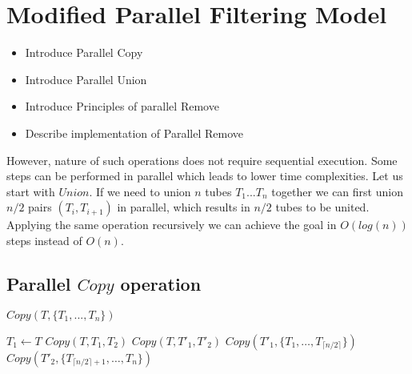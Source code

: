 \section{Modified Parallel Filtering Model}\label{mpfm}
\begin{itemize}
	\item Introduce Parallel Copy
	\item Introduce Parallel Union
	\item Introduce Principles of parallel Remove
	\item Describe implementation of Parallel Remove
\end{itemize}

However, nature of such operations does not require sequential execution. Some steps can be performed in parallel which leads to lower time complexities.
Let us start with $Union$. If we need to union $n$ tubes $T_1...T_n$ together we can first union $n/2$ pairs $(T_i, T_{i+1})$ in parallel, which results in $n/2$ tubes to be united. Applying the same operation recursively we can achieve the goal in $O(log(n))$ steps instead of $O(n)$.

\subsection{Parallel $Copy$ operation}
\PROCEDURE $Copy(T, \{T_1, ..., T_n\})$
\begin{algorithmic}[1]
	  \STATE $T_1 \gets T$ \label{c_one}
	  \STATE $Copy(T, T_1, T_2)$ \label{c_two}
	  \STATE $Copy(T, T'_1, T'_2)$
    \INPARALLELDO
      \PSTATE $Copy(T'_1, \{T_1, \dots, T_{\lceil n/2 \rceil}\})$	\label{c_left}
      \PSTATE $Copy(T'_2, \{T_{\lceil n/2 \rceil+1}, \dots, T_n\})$	\label{c_right}
    \ENDINPARALLELDO
	\ENDIF
\end{algorithmic}


